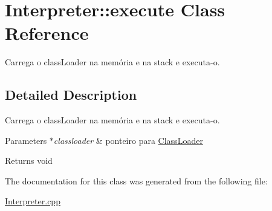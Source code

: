 \hypertarget{class_interpreter_1_1execute}{}\section{Interpreter\+:\+:execute Class Reference}
\label{class_interpreter_1_1execute}


Carrega o class\+Loader na memória e na stack e executa-\/o.  




\subsection{Detailed Description}
Carrega o class\+Loader na memória e na stack e executa-\/o. 


\begin{DoxyParams}{Parameters}
{\em $\ast$classloader} & ponteiro para \hyperlink{class_class_loader}{Class\+Loader} \\
\hline
\end{DoxyParams}
\begin{DoxyReturn}{Returns}
void 
\end{DoxyReturn}


The documentation for this class was generated from the following file\+:\begin{DoxyCompactItemize}
\item 
\hyperlink{_interpreter_8cpp}{Interpreter.\+cpp}\end{DoxyCompactItemize}
